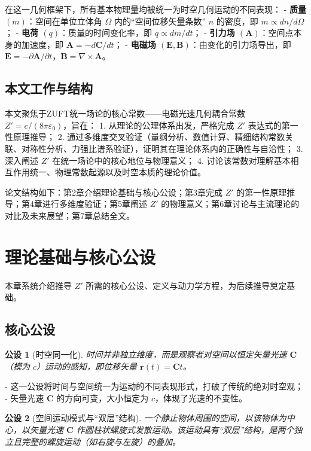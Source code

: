 \documentclass[a4paper,12pt]{article}
\theoremstyle{plain}
\newtheorem{postulate}{公设}[section]
\renewcommand{\vec}[1]{\bm{#1}}
\begin{document}
在这一几何框架下，所有基本物理量均被统一为时空几何运动的不同表现：
- \textbf{质量 $(m)$}：空间在单位立体角 $\Omega$ 内的“空间位移矢量条数” $n$ 的密度，即 $m \propto dn/d\Omega$；
- \textbf{电荷 $(q)$}：质量的时间变化率，即 $q \propto dm/dt$；
- \textbf{引力场 $(\vec{A})$}：空间点本身的加速度，即 $\vec{A} = -d\vec{C}/dt$；
- \textbf{电磁场 $(\vec{E}, \vec{B})$}：由变化的引力场导出，即 $\vec{E} = -\partial\vec{A}/\partial t$，$\vec{B} = \nabla \times \vec{A}$。

\subsection{本文工作与结构}
本文聚焦于ZUFT统一场论的核心常数——电磁光速几何耦合常数 $Z' = c/(8\pi\varepsilon_0)$，旨在：
1. 从理论的公理体系出发，严格完成 $Z'$ 表达式的第一性原理推导；
2. 通过多维度交叉验证（量纲分析、数值计算、精细结构常数关联、对称性分析、力强比谱系验证），证明其在理论体系内的正确性与自洽性；
3. 深入阐述 $Z'$ 在统一场论中的核心地位与物理意义；
4. 讨论该常数对理解基本相互作用统一、物理常数起源以及时空本质的理论价值。

论文结构如下：第2章介绍理论基础与核心公设；第3章完成 $Z'$ 的第一性原理推导；第4章进行多维度验证；第5章阐述 $Z'$ 的物理意义；第6章讨论与主流理论的对比及未来展望；第7章总结全文。

\section{理论基础与核心公设}
本章系统介绍推导 $Z'$ 所需的核心公设、定义与动力学方程，为后续推导奠定基础。

\subsection{核心公设}

\begin{postulate}[时空同一化]
时间并非独立维度，而是观察者对空间以恒定矢量光速 $\vec{C}$（模为 $c$）运动的感知，即位移矢量 $\vec{r}(t) = \vec{C}t$。
\end{postulate}

- 这一公设将时间与空间统一为运动的不同表现形式，打破了传统的绝对时空观；
- 矢量光速 $\vec{C}$ 的方向可变，大小恒定为 $c$，体现了光速的不变性。

\begin{postulate}[空间运动模式与“双层”结构]
一个静止物体周围的空间，以该物体为中心，以矢量光速 $\vec{C}$ 作圆柱状螺旋式发散运动。该运动具有“双层”结构，是两个独立且完整的螺旋运动（如右旋与左旋）的叠加。
\end{postulate}
\end{document}
